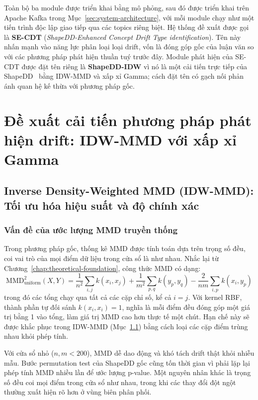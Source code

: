 \label{par:naming-convention}
Toàn bộ ba module được triển khai bằng mô phỏng, sau đó được triển khai trên Apache Kafka trong Mục~\ref{sec:system-architecture}, với mỗi module chạy như một tiến trình độc lập giao tiếp qua các topics riêng biệt. Hệ thống đề xuất được gọi là \textbf{SE-CDT} (\textit{ShapeDD-Enhanced Concept Drift Type identification}). Tên này nhấn mạnh vào năng lực phân loại loại drift, vốn là đóng góp gốc của luận văn so với các phương pháp phát hiện thuần tuý trước đây. Module phát hiện của SE-CDT được đặt tên riêng là \textbf{ShapeDD-IDW} vì nó là một cải tiến trực tiếp của ShapeDD~\cite{shapeDD2021} bằng IDW-MMD và xấp xỉ Gamma; cách đặt tên có gạch nối phản ánh quan hệ kế thừa với phương pháp gốc.

\section{Đề xuất cải tiến phương pháp phát hiện drift: IDW-MMD với xấp xỉ Gamma}

\subsection{Inverse Density-Weighted MMD (IDW-MMD): Tối ưu hóa hiệu suất và độ chính xác}
\label{sec:idw-mmd}

\subsubsection{Vấn đề của ước lượng MMD truyền thống}
Trong phương pháp gốc, thống kê MMD được tính toán dựa trên trọng số đều, coi vai trò của mọi điểm dữ liệu trong cửa sổ là như nhau. Nhắc lại từ Chương~\ref{chap:theoretical-foundation}, công thức MMD có dạng:
\begin{equation}
	\text{MMD}^2_{\text{uniform}}(X, Y) = \frac{1}{n^2}\sum_{i,j} k(x_i, x_j) + \frac{1}{m^2}\sum_{p,q} k(y_p, y_q) - \frac{2}{nm}\sum_{i,p} k(x_i, y_p)
\end{equation}
trong đó các tổng chạy qua tất cả các cặp chỉ số, kể cả $i=j$. Với kernel RBF, thành phần tự đối sánh $k(x_i, x_i) = 1$, nghĩa là mỗi điểm đều đóng góp một giá trị bằng 1 vào tổng, làm giá trị MMD cao hơn thực tế một chút. Hạn chế này sẽ được khắc phục trong IDW-MMD (Mục~\ref{sec:idw-mmd}) bằng cách loại các cặp điểm trùng nhau khỏi phép tính.

Với cửa sổ nhỏ ($n, m < 200$), MMD dễ dao động và khó tách drift thật khỏi nhiễu mẫu. Bước permutation test của ShapeDD gốc cũng tốn thời gian vì phải lặp lại phép tính MMD nhiều lần để ước lượng p-value. Một nguyên nhân khác là trọng số đều coi mọi điểm trong cửa sổ như nhau, trong khi các thay đổi đột ngột thường xuất hiện rõ hơn ở vùng biên phân phối.

